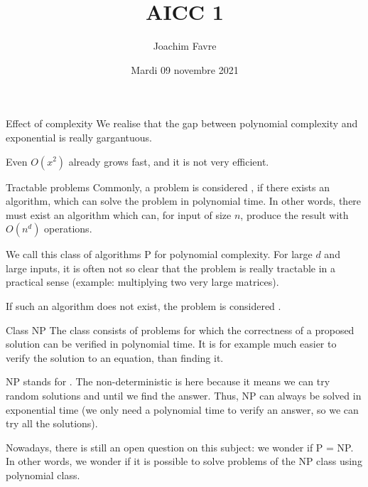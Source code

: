 \documentclass[a4paper]{article}
\title{AICC 1}
\author{Joachim Favre}
\date{Mardi 09 novembre 2021}
\begin{document}
\maketitle



\begin{parag}{Effect of complexity}
    We realise that the gap between polynomial complexity and exponential is really gargantuous.

    Even $O\left(x^2\right)$ already grows fast, and it is not very efficient.
\end{parag}

\begin{parag}{Tractable problems}
    Commonly, a problem is considered , if there exists an algorithm, which can solve the problem in polynomial time. In other words, there must exist an algorithm which can, for input of size $n$, produce the result with $O\left(n^d\right)$ operations.

    We call this class of algorithms P for polynomial complexity. For large $d$ and large inputs, it is often not so clear that the problem is really tractable in a practical sense (example: multiplying two very large matrices).

    If such an algorithm does not exist, the problem is considered .
\end{parag}

\begin{parag}{Class NP}
    The class  consists of problems for which the correctness of a proposed solution can be verified in polynomial time. It is for example much easier to verify the solution to an equation, than finding it.

    NP stands for . The non-deterministic is here because it means we can try random solutions and until we find the answer. Thus, NP can always be solved in exponential time (we only need a polynomial time to verify an answer, so we can try all the solutions).

    Nowadays, there is still an open question on this subject: we wonder if P = NP. In other words, we wonder if it is possible to solve problems of the NP class using polynomial class.
\end{parag}
\end{document}
